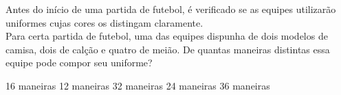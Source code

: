 Antes do início de uma partida de futebol, é verificado se as equipes utilizarão uniformes cujas cores os distingam claramente.\\Para certa partida de futebol, uma das equipes dispunha de dois modelos de camisa, dois de calção e quatro de meião. De quantas maneiras distintas essa equipe pode compor seu uniforme?

16 maneiras
12 maneiras
32 maneiras
24 maneiras
36 maneiras



